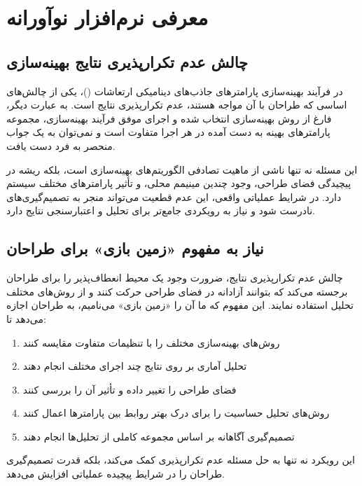 

\chapter{معرفی نرم‌افزار نوآورانه }

\section{چالش عدم تکرارپذیری نتایج بهینه‌سازی}

در فرآیند بهینه‌سازی پارامترهای جاذب‌های دینامیکی ارتعاشات ()، یکی از چالش‌های اساسی که طراحان با آن مواجه هستند، عدم تکرارپذیری نتایج است. به عبارت دیگر، فارغ از روش بهینه‌سازی انتخاب شده و اجرای موفق فرآیند بهینه‌سازی، مجموعه پارامترهای بهینه به دست آمده در هر اجرا متفاوت است و نمی‌توان به یک جواب منحصر به فرد دست یافت.

این مسئله نه تنها ناشی از ماهیت تصادفی الگوریتم‌های بهینه‌سازی است، بلکه ریشه در پیچیدگی فضای طراحی، وجود چندین مینیمم محلی، و تأثیر پارامترهای مختلف سیستم دارد. در شرایط عملیاتی واقعی، این عدم قطعیت می‌تواند منجر به تصمیم‌گیری‌های نادرست شود و نیاز به رویکردی جامع‌تر برای تحلیل و اعتبارسنجی نتایج دارد.

\section{نیاز به مفهوم «زمین بازی» برای طراحان}

چالش عدم تکرارپذیری نتایج، ضرورت وجود یک محیط انعطاف‌پذیر را برای طراحان برجسته می‌کند که بتوانند آزادانه در فضای طراحی حرکت کنند و از روش‌های مختلف تحلیل استفاده نمایند. این مفهوم که ما آن را «زمین بازی» می‌نامیم، به طراحان اجازه می‌دهد تا:

\begin{enumerate}
\item روش‌های بهینه‌سازی مختلف را با تنظیمات متفاوت مقایسه کنند
\item تحلیل آماری بر روی نتایج چند اجرای مختلف انجام دهند
\item فضای طراحی را تغییر داده و تأثیر آن را بررسی کنند
\item روش‌های تحلیل حساسیت را برای درک بهتر روابط بین پارامترها اعمال کنند
\item تصمیم‌گیری آگاهانه بر اساس مجموعه کاملی از تحلیل‌ها انجام دهند
\end{enumerate}

این رویکرد نه تنها به حل مسئله عدم تکرارپذیری کمک می‌کند، بلکه قدرت تصمیم‌گیری طراحان را در شرایط پیچیده عملیاتی افزایش می‌دهد.

